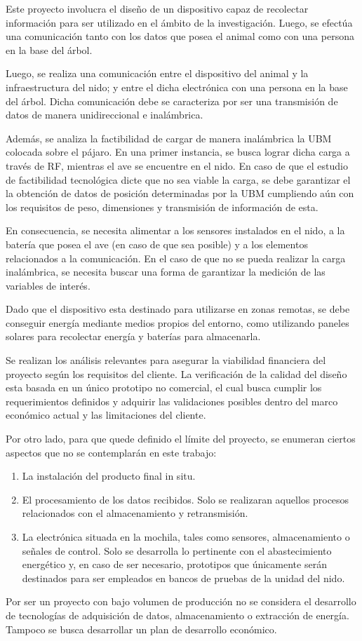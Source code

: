 Este proyecto involucra el diseño de un dispositivo capaz de recolectar información para ser utilizado en el ámbito de la investigación. Luego, se efectúa una comunicación tanto con los datos que posea el animal como con una persona en la base del árbol.

Luego, se realiza una comunicación entre el dispositivo del animal y la infraestructura del nido; y entre el dicha electrónica con una persona en la base del árbol. Dicha comunicación debe se caracteriza por ser una transmisión de datos de manera unidireccional e inalámbrica.

Además, se analiza la factibilidad de cargar de manera inalámbrica la UBM colocada sobre el pájaro. En una primer instancia, se busca lograr dicha carga a través de RF, mientras el ave se encuentre en el nido. En caso de que el estudio de factibilidad tecnológica dicte que no sea viable la carga, se debe garantizar el la obtención de datos de posición determinadas por la UBM cumpliendo aún con los requisitos de peso, dimensiones y transmisión de información de esta.

En consecuencia, se necesita alimentar a los sensores instalados en el nido, a la batería que posea el ave (en caso de que sea posible) y a los elementos relacionados a la comunicación. En el caso de que no se pueda realizar la carga inalámbrica, se necesita buscar una forma de garantizar la medición de las variables de interés.

Dado que el dispositivo esta destinado para utilizarse en zonas remotas, se debe conseguir energía mediante medios propios del entorno, como utilizando paneles solares para recolectar energía y baterías para almacenarla.

Se realizan los análisis relevantes para asegurar la viabilidad financiera del proyecto según los requisitos del cliente. La verificación de la calidad del diseño esta basada en un único prototipo no comercial, el cual busca cumplir los requerimientos definidos y adquirir las validaciones posibles dentro del marco económico actual y las limitaciones del cliente. 

Por otro lado, para que quede definido el límite del proyecto, se enumeran ciertos aspectos que no se contemplarán en este trabajo:
\begin{enumerate}
	\item La instalación del producto final in situ.
	\item El procesamiento de los datos recibidos. Solo se realizaran aquellos procesos relacionados con el almacenamiento y retransmisión.
	\item La electrónica situada en la mochila, tales como sensores, almacenamiento o señales de control. Solo se desarrolla lo pertinente con el abastecimiento energético y, en caso de ser necesario, prototipos que únicamente serán destinados para ser empleados en bancos de pruebas de la unidad del nido. 
\end{enumerate}

Por ser un proyecto con bajo volumen de producción no se considera el desarrollo de tecnologías de adquisición de datos, almacenamiento o extracción de energía. Tampoco se busca desarrollar un plan de desarrollo económico.